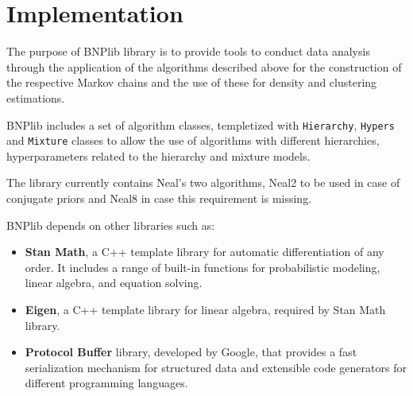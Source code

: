 
\chapter{Implementation}
The purpose of BNPlib library is to provide tools to conduct data analysis through the application of the algorithms described above for the construction of the respective Markov chains and the use of these for density and clustering estimations.

BNPlib includes a set of algorithm classes, templetized with \verb|Hierarchy|, \verb|Hypers| and \verb|Mixture| classes to allow the use of algorithms with different hierarchies, hyperparameters related to the hierarchy and mixture models.

The library currently contains Neal's two algorithms, Neal2 to be used in case of conjugate priors and Neal8 in case this requirement is missing.

BNPlib depends on other libraries such as:
\begin{itemize}

\item \textbf{Stan Math}, a C++ template library for automatic differentiation of any order. It includes a range of built-in functions for probabilistic modeling, linear algebra, and equation solving.

\item \textbf{Eigen}, a C++ template library for linear algebra, required by Stan Math library. 

\item \textbf{Protocol Buffer} library, developed by Google, that provides a fast serialization mechanism for structured data and extensible code generators for different programming languages.

\end{itemize}

